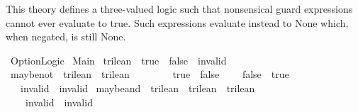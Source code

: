 %
\begin{isabellebody}%
%
%
\isadelimdocument
%
\endisadelimdocument
%
\isatagdocument
%
\isamarkuptrue%
%
\endisatagdocument
{\isafolddocument}%
%
\isadelimdocument
%
\endisadelimdocument
%
\begin{isamarkuptext}%
This theory defines a three-valued logic such that nonsensical guard expressions cannot ever
evaluate to true. Such expressions evaluate instead to None which, when negated, is still None.%
\end{isamarkuptext}\isamarkuptrue%
%
\isadelimtheory
%
\endisadelimtheory
%
\isatagtheory
{}\isamarkupfalse%
\ Option{\isacharunderscore}Logic\isanewline
{}\ Main\isanewline
{}%
\endisatagtheory
{\isafoldtheory}%
%
\isadelimtheory
%
\endisadelimtheory
\isanewline
\isanewline
{}\isamarkupfalse%
\ trilean\ {\isacharequal}\ true\ {\isacharbar}\ false\ {\isacharbar}\ invalid\isanewline
\isanewline
{}\isamarkupfalse%
\ maybe{\isacharunderscore}not\ {\isacharcolon}{\isacharcolon}\ {\isachardoublequoteopen}trilean\ {\isasymRightarrow}\ trilean{\isachardoublequoteclose}\ {\isacharparenleft}{\isachardoublequoteopen}{\isasymnot}\isactrlsub {\isacharquery}\ {\isacharunderscore}{\isachardoublequoteclose}\ {\isacharbrackleft}{}{}{\isacharbrackright}\ {}{}{\isacharparenright}\ \isanewline
\ \ {\isachardoublequoteopen}{\isasymnot}\isactrlsub {\isacharquery}\ true\ {\isacharequal}\ false{\isachardoublequoteclose}\ {\isacharbar}\isanewline
\ \ {\isachardoublequoteopen}{\isasymnot}\isactrlsub {\isacharquery}\ false\ {\isacharequal}\ true{\isachardoublequoteclose}\ {\isacharbar}\isanewline
\ \ {\isachardoublequoteopen}{\isasymnot}\isactrlsub {\isacharquery}\ invalid\ {\isacharequal}\ invalid{\isachardoublequoteclose}\isanewline
\isanewline
{}\isamarkupfalse%
\ maybe{\isacharunderscore}and\ {\isacharcolon}{\isacharcolon}\ {\isachardoublequoteopen}trilean\ {\isasymRightarrow}\ trilean\ {\isasymRightarrow}\ trilean{\isachardoublequoteclose}\ {\isacharparenleft}\ {\isachardoublequoteopen}{\isasymand}\isactrlsub {\isacharquery}{\isachardoublequoteclose}\ {}{}{\isacharparenright}\ \isanewline
\ \ {\isachardoublequoteopen}{\isacharunderscore}\ {\isasymand}\isactrlsub {\isacharquery}\ invalid\ {\isacharequal}\ invalid{\isachardoublequoteclose}\ {\isacharbar}\isanewline

\end{isabellebody}
